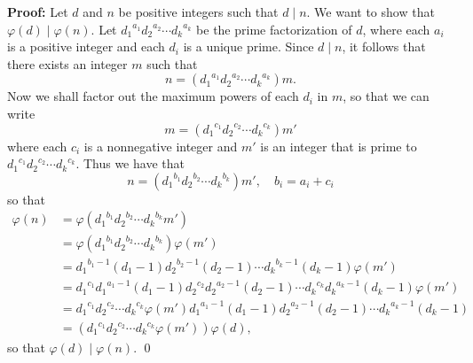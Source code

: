 \begin{enumerate}
      \textbf{Proof:} Let $d$ and $n$ be positive integers such that $d \mid n$.
      We want to show that $\varphi(d) \mid \varphi(n)$. Let
      ${d_1}^{a_1}{d_2}^{a_2}\cdots{d_k}^{a_k}$ be the prime factorization of
      $d$, where each $a_i$ is a positive integer and each $d_i$ is a unique
      prime. Since $d \mid n$, it follows that there exists an integer $m$ such
      that
      $$n = ({d_1}^{a_1}{d_2}^{a_2}\cdots{d_k}^{a_k})m.$$
      Now we shall factor out the maximum powers of each $d_i$ in $m$, so that 
      we can write
      $$m = ({d_1}^{c_1}{d_2}^{c_2}\cdots{d_k}^{c_k})m'$$
      where each $c_i$ is a nonnegative integer and $m'$ is an integer that is
      prime to ${d_1}^{c_1}{d_2}^{c_2}\cdots{d_k}^{c_k}$. Thus we have that
      $$n = ({d_1}^{b_1}{d_2}^{b_2}\cdots{d_k}^{b_k})m', \quad b_i = a_i + c_i$$
      so that
      \begin{align*}
         \varphi(n) &= \varphi({d_1}^{b_1}{d_2}^{b_2}\cdots{d_k}^{b_k}m') \\
                    &= \varphi({d_1}^{b_1}{d_2}^{b_2}\cdots{d_k}^{b_k})
                       \varphi(m') \\
                    &= {d_1}^{b_1 - 1}(d_1 - 1){d_2}^{b_2 - 1}(d_2 - 1)\cdots
                       {d_k}^{b_k - 1}(d_k - 1)\varphi(m') \\
                    &= {d_1}^{c_1}{d_1}^{a_1 - 1}(d_1 - 1)
                       {d_2}^{c_2}{d_2}^{a_2 - 1}(d_2 - 1)\cdots
                       {d_k}^{c_k}{d_k}^{a_k - 1}(d_k - 1)\varphi(m')\\
                    &= {d_1}^{c_1}{d_2}^{c_2}\cdots{d_k}^{c_k}\varphi(m')
                       {d_1}^{a_1 - 1}(d_1 - 1)
                       {d_2}^{a_2 - 1}(d_2 - 1)\cdots
                       {d_k}^{a_k - 1}(d_k - 1) \\
                    &= ({d_1}^{c_1}{d_2}^{c_2}\cdots{d_k}^{c_k}
                        \varphi(m'))\varphi(d),
      \end{align*}
      so that $\varphi(d) \mid \varphi(n)$. \qed
      
\end{enumerate}

